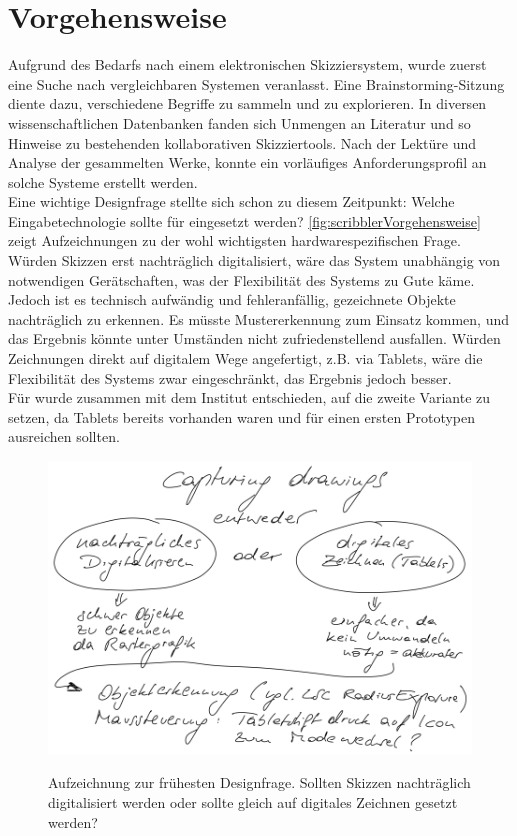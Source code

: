 \section{Vorgehensweise} 
Aufgrund des Bedarfs nach einem elektronischen Skizziersystem, wurde zuerst eine Suche nach vergleichbaren Systemen veranlasst. Eine Brainstorming-Sitzung diente dazu, verschiedene Begriffe zu sammeln und zu explorieren. In diversen wissenschaftlichen Datenbanken fanden sich Unmengen an Literatur und so Hinweise zu bestehenden kollaborativen Skizziertools. Nach der Lektüre und Analyse der gesammelten Werke, konnte ein vorläufiges Anforderungsprofil an solche Systeme erstellt werden. \\
Eine wichtige Designfrage stellte sich schon zu diesem Zeitpunkt: Welche Eingabetechnologie sollte für \scribbler eingesetzt werden? \autoref{fig:scribblerVorgehensweise} zeigt Aufzeichnungen zu der wohl wichtigsten hardwarespezifischen Frage. Würden Skizzen erst nachträglich digitalisiert, wäre das System unabhängig von notwendigen Gerätschaften, was der Flexibilität des Systems zu Gute käme. Jedoch ist es technisch aufwändig und fehleranfällig, gezeichnete Objekte nachträglich zu erkennen. Es müsste Mustererkennung zum Einsatz kommen, und das Ergebnis könnte unter Umständen nicht zufriedenstellend ausfallen. Würden Zeichnungen direkt auf digitalem Wege angefertigt, z.B. via Tablets, wäre die Flexibilität des Systems zwar eingeschränkt, das Ergebnis jedoch besser. \\
Für \scribbler wurde zusammen mit dem Institut entschieden, auf die zweite Variante zu setzen, da Tablets bereits vorhanden waren und für einen ersten Prototypen ausreichen sollten.

\begin{figure}
	        {\includegraphics[width=1\linewidth]{gfx/scribblerVorgehensweise}}
		\caption[Aufzeichnung zur frühesten Designfrage]{Aufzeichnung zur frühesten Designfrage. Sollten Skizzen nachträglich digitalisiert werden oder sollte gleich auf digitales Zeichnen gesetzt werden?}\label{fig:scribblerVorgehensweise}
\end{figure}


